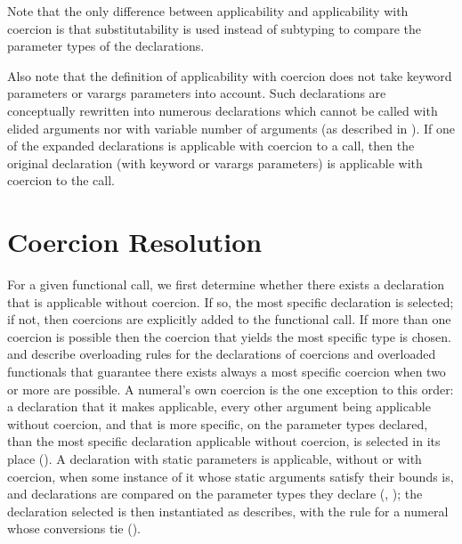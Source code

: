 Note that the only difference between applicability and applicability
with coercion is that substitutability is used instead of subtyping
to compare the parameter types of the declarations.

Also note that the definition of applicability with coercion does not
take keyword parameters or varargs parameters into account.  Such
declarations are conceptually rewritten into numerous declarations
which cannot be called with elided arguments nor with variable number of
arguments (as described in ).  If
one of the expanded declarations is applicable with coercion to a call,
then the original declaration (with keyword or varargs parameters) is
applicable with coercion to the call.



\section{Coercion Resolution}
For a given functional call, we first determine whether there exists a
declaration that is applicable without coercion.  If so, the most
specific declaration is selected; if not, then coercions are
explicitly added to the functional call.  If more than one coercion is
possible then the coercion that yields the most specific type is
chosen.   and
 describe overloading rules for the
declarations of coercions and overloaded functionals that guarantee
there exists always a most specific coercion when two or more are possible.
A numeral's own coercion is the one exception to this order: a declaration that
it makes applicable, every other argument being applicable without coercion,
and that is more specific, on the parameter types declared, than the most
specific declaration applicable without coercion, is selected in its place
().
A declaration with static parameters is applicable, without or with coercion,
when some instance of it whose static arguments satisfy their bounds is, and
declarations are compared on the parameter types they declare
(, ); the
declaration selected is then instantiated as 
describes, with the rule for a numeral whose conversions tie
().

